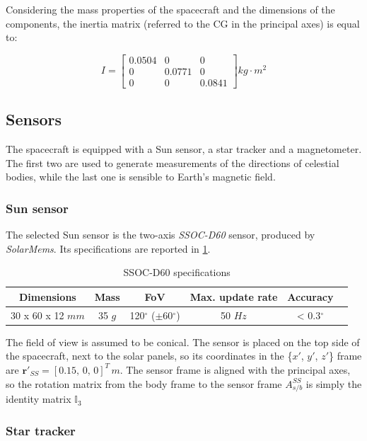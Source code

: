 Considering the mass properties of the spacecraft and the dimensions of the components, the inertia matrix (referred to the CG in the principal axes) is equal to:

$$ I = \begin{bmatrix} 0.0504 & 0 & 0 \\
0 & 0.0771 & 0 \\
0 & 0 & 0.0841 
\end{bmatrix} kg \cdot m^2 $$

\subsection{Sensors}

The spacecraft is equipped with a Sun sensor, a star tracker and a magnetometer. The first two are used to generate measurements of the directions of celestial bodies, while the last one is sensible to Earth's magnetic field.

\subsubsection{Sun sensor}

The selected Sun sensor is the two-axis \textit{SSOC-D60} sensor, produced by \textit{SolarMems}. Its specifications are reported in \cref{tab:sun_sensor}.

\begin{table}[h]
    \centering
    \caption{SSOC-D60 specifications \cite{sun_sensor}}
    \begin{tabular}{cccccc}
    \toprule
    \toprule
    \textbf{Dimensions} & \textbf{Mass} & \textbf{FoV} & \textbf{Max. update rate} & \textbf{Accuracy} \\
    \midrule
    30 x 60 x 12 $mm$ & 35 $g$ & 120$^{\circ}$ ($\pm$60$^{\circ}$) & 50 $Hz$ & < 0.3$^{\circ}$ \\
    \bottomrule
    \bottomrule
    \end{tabular}
    \label{tab:sun_sensor}
\end{table}

The field of view is assumed to be conical. The sensor is placed on the top side of the spacecraft, next to the solar panels, so its coordinates in the \{$x'$, $y'$, $z'$\} frame are $\mathbf{r}'_{SS} = [0.15,\, 0,\, 0]^T \, m$. The sensor frame is aligned with the principal axes, so the rotation matrix from the body frame to the sensor frame $A_{s/b}^{SS}$ is simply the identity matrix $\mathbb{I}_3$

\subsubsection{Star tracker}

